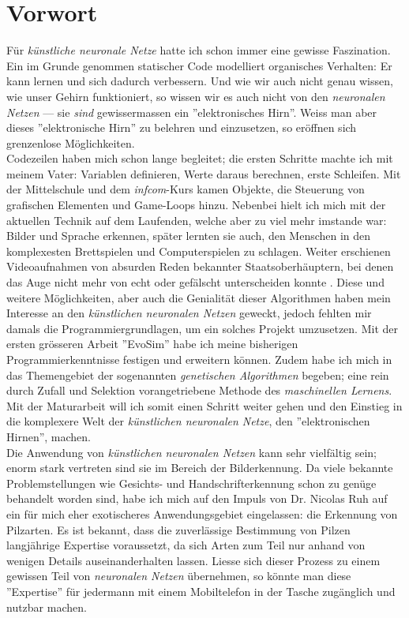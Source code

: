 \section*{Vorwort}
 Für \textit{künstliche neuronale Netze} hatte ich schon immer eine gewisse Faszination. Ein im Grunde genommen statischer Code modelliert organisches Verhalten: Er kann lernen und sich dadurch verbessern. Und wie wir auch nicht genau wissen, wie unser Gehirn funktioniert, so wissen wir es auch nicht von den \textit{neuronalen Netzen} --- sie \textit{sind} gewissermassen ein ''elektronisches Hirn''. Weiss man aber dieses ''elektronische Hirn'' zu belehren und einzusetzen, so eröffnen sich grenzenlose Möglichkeiten.\\
 
 Codezeilen haben mich schon lange begleitet; die ersten Schritte machte ich mit meinem Vater: Variablen definieren, Werte daraus berechnen, erste Schleifen. Mit der Mittelschule und dem \textit{infcom}-Kurs kamen Objekte, die Steuerung von grafischen Elementen und Game-Loops hinzu. Nebenbei hielt ich mich mit der aktuellen Technik auf dem Laufenden, welche aber zu viel mehr imstande war: Bilder und Sprache erkennen, später lernten sie auch, den Menschen in den komplexesten Brettspielen\cite{alphago} und Computerspielen\cite{openai} zu schlagen. Weiter erschienen Videoaufnahmen von absurden Reden bekannter Staatsoberhäuptern, bei denen das Auge nicht mehr von echt oder gefälscht unterscheiden konnte \cite{deepfake}. Diese und weitere Möglichkeiten, aber auch die Genialität dieser Algorithmen haben mein Interesse an den \textit{künstlichen neuronalen Netzen} geweckt, jedoch fehlten mir damals die Programmiergrundlagen, um ein solches Projekt umzusetzen. Mit der ersten grösseren Arbeit ''EvoSim''\cite{evosim} habe ich meine bisherigen Programmierkenntnisse festigen und erweitern können. Zudem habe ich mich in das Themengebiet der sogenannten \textit{genetischen Algorithmen} begeben; eine rein durch Zufall und Selektion vorangetriebene Methode des \textit{maschinellen Lernens}. Mit der Maturarbeit will ich somit einen Schritt weiter gehen und den Einstieg in die komplexere Welt der \textit{künstlichen neuronalen Netze}, den ''elektronischen Hirnen'', machen.\\
 
 Die Anwendung von \textit{künstlichen neuronalen Netzen} kann sehr vielfältig sein; enorm stark vertreten sind sie im Bereich der Bilderkennung. Da viele bekannte Problemstellungen wie Gesichts- und Handschrifterkennung schon zu genüge behandelt worden sind, habe ich mich auf den Impuls von Dr. Nicolas Ruh auf ein für mich eher exotischeres Anwendungsgebiet eingelassen: die Erkennung von Pilzarten. Es ist bekannt, dass die zuverlässige Bestimmung von Pilzen langjährige Expertise voraussetzt, da sich Arten zum Teil nur anhand von wenigen Details auseinanderhalten lassen. Liesse sich dieser Prozess zu einem gewissen Teil von \textit{neuronalen Netzen} übernehmen, so könnte man diese ''Expertise'' für jedermann mit einem Mobiltelefon in der Tasche zugänglich und nutzbar machen.\\ 
 
